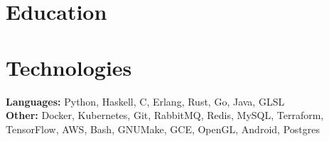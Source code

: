 \documentclass{cv_doc}
\begin{document}
\vspace{0.3cm}

\section*{Education}


\vspace{0.3cm}

\section*{Technologies}

\textbf{Languages:} Python, Haskell, C, Erlang, Rust, Go, Java, GLSL \\
\textbf{Other:} Docker, Kubernetes, Git, RabbitMQ, Redis, MySQL, Terraform, TensorFlow, AWS, Bash, GNUMake, GCE, OpenGL,
Android, Postgres
\end{document}
